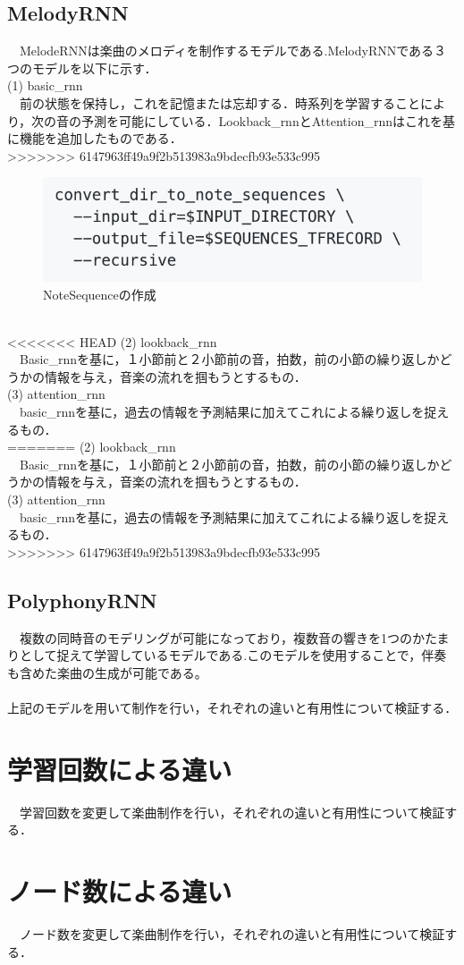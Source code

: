 \subsection{MelodyRNN}
　MelodeRNNは楽曲のメロディを制作するモデルである.MelodyRNNである３つのモデルを以下に示す．\\
(1) basic\_rnn\\
　前の状態を保持し，これを記憶または忘却する．時系列を学習することにより，次の音の予測を可能にしている．Lookback\_rnnとAttention\_rnnはこれを基に機能を追加したものである．\\
>>>>>>> 6147963ff49a9f2b513983a9bdecfb93e533c995
\begin{figure}[!ht]
    \begin{screen}
    \begin{center}
        \includegraphics[scale=0.7, clip]{./img/Notesequence_make.png}
        \caption{NoteSequenceの作成}
        \label{fig:NoteSequenceの作成}
    \end{center}
    \end{screen}
\end{figure} \\
<<<<<<< HEAD
(2)	lookback_rnn\\
　Basic_rnnを基に，１小節前と２小節前の音，拍数，前の小節の繰り返しかどうかの情報を与え，音楽の流れを掴もうとするもの．\\
(3)	attention_rnn\\
　basic_rnnを基に，過去の情報を予測結果に加えてこれによる繰り返しを捉えるもの．\\
=======
(2) lookback\_rnn\\
　Basic\_rnnを基に，１小節前と２小節前の音，拍数，前の小節の繰り返しかどうかの情報を与え，音楽の流れを掴もうとするもの．\\
(3) attention\_rnn\\
　basic\_rnnを基に，過去の情報を予測結果に加えてこれによる繰り返しを捉えるもの．\\
>>>>>>> 6147963ff49a9f2b513983a9bdecfb93e533c995

\subsection{PolyphonyRNN}
　複数の同時音のモデリングが可能になっており，複数音の響きを1つのかたまりとして捉えて学習しているモデルである.このモデルを使用することで，伴奏も含めた楽曲の生成が可能である。\\
\\
上記のモデルを用いて制作を行い，それぞれの違いと有用性について検証する．
\section{学習回数による違い}
　学習回数を変更して楽曲制作を行い，それぞれの違いと有用性について検証する．
\section{ノード数による違い}
　ノード数を変更して楽曲制作を行い，それぞれの違いと有用性について検証する．